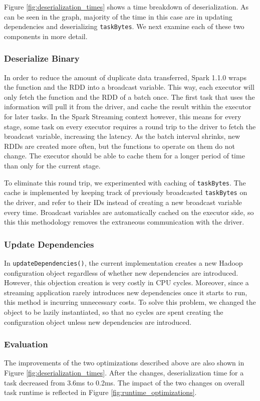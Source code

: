 Figure \ref{fig:deserialization_times} shows a time breakdown of deserialization. As can be seen in the graph, majority of the time in this case are in updating dependencies and deserializing \texttt{taskBytes}. We next examine each of these two components in more detail.

\subsubsection{Deserialize Binary}
In order to reduce the amount of duplicate data transferred, Spark 1.1.0 wraps the function and the RDD into a broadcast variable. This way, each executor will only fetch the function and the RDD of a batch once. The first task that uses the information will pull it from the driver, and cache the result within the executor for later tasks. In the Spark Streaming context however, this means for every stage, some task on every executor requires a round trip to the driver to fetch the broadcast variable, increasing the latency. As the batch interval shrinks, new RDDs are created more often, but the functions to operate on them do not change. The executor should be able to cache them for a longer period of time than only for the current stage.

To eliminate this round trip, we experimented with caching of \texttt{taskBytes}. The cache is implemented by keeping track of previously broadcasted \texttt{taskBytes} on the driver, and refer to their IDs instead of creating a new broadcast variable every time. Broadcast variables are automatically cached on the executor side, so this this methodology removes the extraneous communication with the driver.

\subsubsection{Update Dependencies}
In \texttt{updateDependencies()}, the current implementation creates a new Hadoop configuration object regardless of whether new dependencies are introduced. However, this objection creation is very costly in CPU cycles. Moreover, since a streaming application rarely introduces new dependencies once it starts to run, this method is incurring unnecessary costs. To solve this problem, we changed the object to be lazily instantiated, so that no cycles are spent creating the configuration object unless new dependencies are introduced.

\subsubsection{Evaluation}
The improvements of the two optimizations described above are also shown in Figure \ref{fig:deserialization_times}. After the changes, deserialization time for a task decreased from 3.6ms to 0.2ms. The impact of the two changes on overall task runtime is reflected in Figure \ref{fig:runtime_optimizations}.

